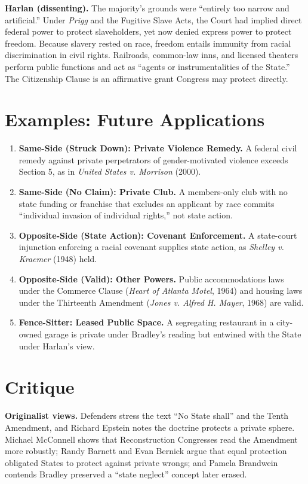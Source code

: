 \documentclass[12pt]{article}
\begin{document}
\textbf{Harlan (dissenting).} The majority's grounds were ``entirely too narrow and artificial.'' Under \textit{Prigg} and the Fugitive Slave Acts, the Court had implied direct federal power to protect slaveholders, yet now denied express power to protect freedom. Because slavery rested on race, freedom entails immunity from racial discrimination in civil rights. Railroads, common-law inns, and licensed theaters perform public functions and act as ``agents or instrumentalities of the State.'' The Citizenship Clause is an affirmative grant Congress may protect directly.

\section{Examples: Future Applications}

\begin{enumerate}
\item \textbf{Same-Side (Struck Down): Private Violence Remedy.} A federal civil remedy against private perpetrators of gender-motivated violence exceeds Section 5, as in \textit{United States v. Morrison} (2000).
\item \textbf{Same-Side (No Claim): Private Club.} A members-only club with no state funding or franchise that excludes an applicant by race commits ``individual invasion of individual rights,'' not state action.
\item \textbf{Opposite-Side (State Action): Covenant Enforcement.} A state-court injunction enforcing a racial covenant supplies state action, as \textit{Shelley v. Kraemer} (1948) held.
\item \textbf{Opposite-Side (Valid): Other Powers.} Public accommodations laws under the Commerce Clause (\textit{Heart of Atlanta Motel}, 1964) and housing laws under the Thirteenth Amendment (\textit{Jones v. Alfred H. Mayer}, 1968) are valid.
\item \textbf{Fence-Sitter: Leased Public Space.} A segregating restaurant in a city-owned garage is private under Bradley's reading but entwined with the State under Harlan's view.
\end{enumerate}

\section{Critique}

\textbf{Originalist views.} Defenders stress the text ``No State shall'' and the Tenth Amendment, and Richard Epstein notes the doctrine protects a private sphere. Michael McConnell shows that Reconstruction Congresses read the Amendment more robustly; Randy Barnett and Evan Bernick argue that equal protection obligated States to protect against private wrongs; and Pamela Brandwein contends Bradley preserved a ``state neglect'' concept later erased.
\end{document}
